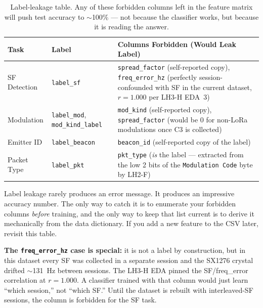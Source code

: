 \documentclass[11pt,letterpaper]{article}
\begin{document}
\begin{table}[h!]
	\centering
	\renewcommand{\arraystretch}{1.3}
	\begin{tabularx}{\textwidth}{l l X}
		\toprule
		\textbf{Task} & \textbf{Label} & \textbf{Columns Forbidden (Would Leak Label)} \\
		\midrule
		SF Detection & \texttt{label\_sf} & \texttt{spread\_factor} (self-reported copy), \texttt{freq\_error\_hz} (perfectly session-confounded with SF in the current dataset, $r = 1.000$ per LH3-H EDA~3) \\
		Modulation   & \texttt{label\_mod}, \texttt{mod\_kind\_label} & \texttt{mod\_kind} (self-reported copy), \texttt{spread\_factor} (would be 0 for non-LoRa modulations once C3 is collected) \\
		Emitter ID   & \texttt{label\_beacon} & \texttt{beacon\_id} (self-reported copy of the label) \\
		Packet Type  & \texttt{label\_pkt} & \texttt{pkt\_type} (\emph{is} the label --- extracted from the low 2 bits of the \texttt{Modulation Code} byte by LH2-F) \\
		\bottomrule
	\end{tabularx}
	\caption{Label-leakage table. Any of these forbidden columns left in the feature matrix will push test accuracy to $\sim$100\% --- not because the classifier works, but because it is reading the answer.}
\end{table}

\begin{tcolorbox}[warning={The Silent Leak}]
	Label leakage rarely produces an error message. It produces an impressive accuracy number. The only way to catch it is to enumerate your forbidden columns \emph{before} training, and the only way to keep that list current is to derive it mechanically from the data dictionary. If you add a new feature to the \mbox{CSV} later, revisit this table.

	\textbf{The \texttt{freq\_error\_hz} case is special:} it is not a label by construction, but in this dataset every \mbox{SF} was collected in a separate session and the \mbox{SX1276} crystal drifted $\sim$131~Hz between sessions. The \mbox{LH3-H} \mbox{EDA} pinned the SF/freq\_error correlation at $r = 1.000$. A classifier trained with that column would just learn ``which session,'' not ``which \mbox{SF}.'' Until the dataset is rebuilt with interleaved-\mbox{SF} sessions, the column is forbidden for the SF task.
\end{tcolorbox}
\end{document}
